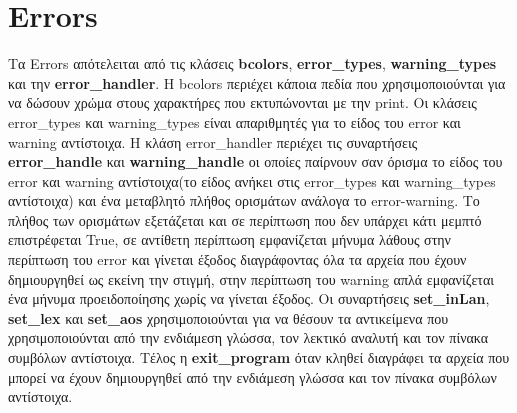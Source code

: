 \documentclass[12pt,a4paper,a4paper]{report}
\begin{document}
\chapter{Errors}
Τα Errors απότελειται από τις κλάσεις \textbf{bcolors}, \textbf{error\_types}, \newline \textbf{warning\_types} και την \textbf{error\_handler}. Η bcolors περιέχει κάποια πεδία που χρησιμοποιούνται για να δώσουν χρώμα στους χαρακτήρες που εκτυπώνονται με την print. Oι κλάσεις error\_types και warning\_types είναι απαριθμητές για το είδος του error και warning αντίστοιχα. Η κλάση error\_handler περιέχει τις συναρτήσεις \textbf{error\_handle} και \textbf{warning\_handle} οι οποίες παίρνουν σαν όρισμα το είδος του error και warning αντίστοιχα(το είδος ανήκει στις error\_types και warning\_types αντίστοιχα) και ένα μεταβλητό πλήθος ορισμάτων ανάλογα το error-warning. Το πλήθος των ορισμάτων εξετάζεται και σε περίπτωση που δεν υπάρχει κάτι μεμπτό επιστρέφεται True, σε αντίθετη περίπτωση εμφανίζεται μήνυμα λάθους στην περίπτωση του error και γίνεται έξοδος διαγράφοντας όλα τα αρχεία που έχουν δημιουργηθεί ως εκείνη την στιγμή, στην περίπτωση του warning απλά εμφανίζεται ένα μήνυμα προειδοποίησης χωρίς να γίνεται έξοδος. Οι συναρτήσεις \textbf{set\_inLan}, \textbf{set\_lex} και \textbf{ set\_aos} χρησιμοποιούνται για να θέσουν τα αντικείμενα που χρησιμοποιούνται από την ενδιάμεση γλώσσα, τον λεκτικό αναλυτή και τον πίνακα συμβόλων αντίστοιχα. Τέλος η \textbf{exit\_program} όταν κληθεί διαγράφει τα αρχεία που μπορεί να έχουν δημιουργηθεί από την ενδιάμεση γλώσσα και τον πίνακα συμβόλων αντίστοιχα.\\
\end{document}

